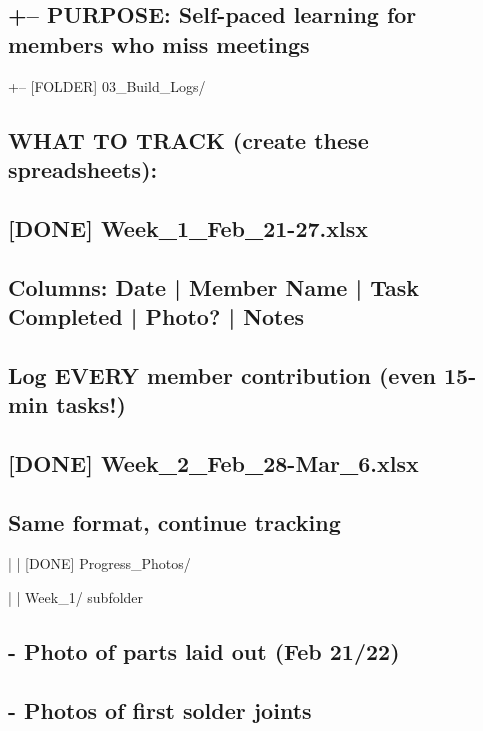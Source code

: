 \documentclass[11pt,letterpaper]{article}
\begin{document}
\subsection*{+-- PURPOSE: Self-paced learning for members who miss meetings}

+-- [FOLDER] 03\_Build\_Logs/\par

\subsection*{WHAT TO TRACK (create these spreadsheets):}

\subsection*{[DONE] Week\_1\_Feb\_21-27.xlsx}

\subsection*{Columns: Date | Member Name | Task Completed | Photo? | Notes}

\subsection*{Log EVERY member contribution (even 15-min tasks!)}

\subsection*{[DONE] Week\_2\_Feb\_28-Mar\_6.xlsx}

\subsection*{Same format, continue tracking}

|   |   [DONE] Progress\_Photos/\par

|   |       Week\_1/ subfolder\par

\subsection*{- Photo of parts laid out (Feb 21/22)}

\subsection*{- Photos of first solder joints}
\end{document}
